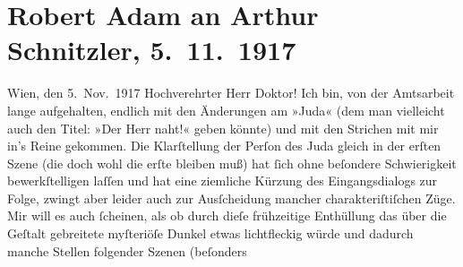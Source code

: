 

         
         \renewcommand{\erwaehntePersonen}{Personen: Titus Livius}
         \renewcommand{\erwaehnteOrte}{Orte: Griechenland, Ostia Antica, Rom, Wien}
         \renewcommand{\erwaehnteWerke}{Werke: Das Ende des Judas}
               \section[Robert Adam an Arthur Schnitzler, 5. 11. 1917]{ Robert Adam an Arthur Schnitzler, 5. 11. 1917}\nopagebreak{}\rehead{ }\begin{ledgroupsized}[t]{13cm}\normalsize\beginnumbering \toendnotes[C]{\smallbreak\pagebreak[2]} 
\pstart
           \raggedleft{}{\pb}Wien, den 5. Nov. 1917\pend
           \pstart\center{}Hochverehrter Herr Doktor!\pend\pstart
           Ich bin, von der Amtsarbeit lange aufgehalten, endlich mit den Änderungen am »Juda« (dem man vielleicht auch den Titel: »Der
               Herr naht!« geben könnte) und mit den Strichen mit mir in’s Reine gekommen. Die
               Klarſtellung der Perſon des Juda gleich in der erſten Szene (die doch wohl die erſte
               bleiben muß) hat ſich ohne beſondere Schwierigkeit bewerkſtelligen laſſen und hat
               eine ziemliche Kürzung des Eingangsdialogs zur Folge, zwingt aber leider auch zur
               Ausſcheidung mancher charakteriſtiſchen Züge. Mir will es auch ſcheinen,  als ob durch dieſe frühzeitige Enthüllung das über
               die Geſtalt gebreitete myſteriöſe Dunkel etwas lichtfleckig würde und  dadurch manche Stellen folgender Szenen (beſonders

\end{ledgroupsized}
